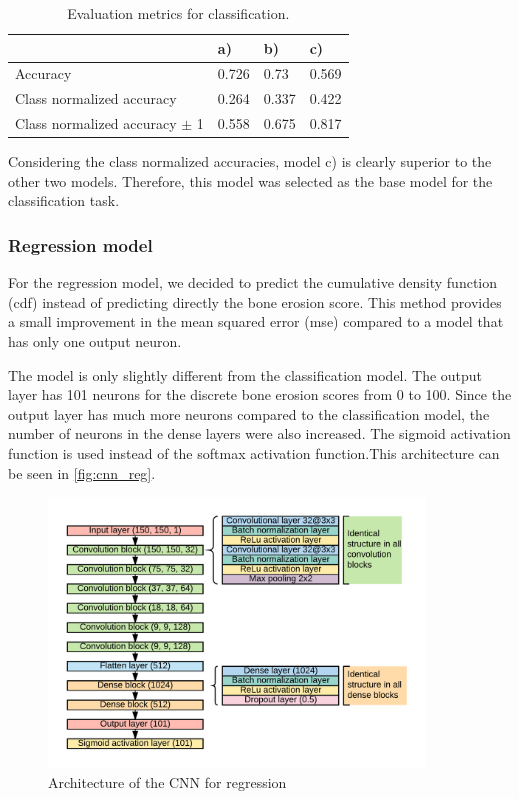 \documentclass[12pt]{article}
\begin{document}
\begin{table}[ht]
\centering
\caption{Evaluation metrics for classification.}
\label{tab:metrics_cla}
\begin{tabular}{@{}llll@{}}
\toprule
                                & a)    & b)    & c)    \\ \midrule
Accuracy                        & 0.726 & 0.73 & 0.569 \\
Class normalized accuracy       & 0.264 & 0.337 & 0.422 \\
Class normalized accuracy $\pm$ 1 & 0.558 & 0.675 & 0.817 \\ \bottomrule
\end{tabular}
\end{table}

Considering the class normalized accuracies, model c) is clearly superior to the other two models. Therefore, this model was selected as the base model for the classification task.

\subsubsection{Regression model}
\label{subsubsec:reg}


For the regression model, we decided to predict the cumulative density function (cdf) instead of predicting directly the bone erosion score. This method provides a small improvement in the mean squared error (mse) compared to a model that has only one output neuron.

The model is only slightly different from the classification model. The output layer has 101 neurons for the discrete bone erosion scores from 0 to 100. Since the output layer has much more neurons compared to the classification model, the number of neurons in the dense layers were also increased. The sigmoid activation function is used instead of the softmax activation function.This architecture can be seen in \autoref{fig:cnn_reg}.

\begin{figure}[ht]
\includegraphics[width=10cm]{cnn_regression}	
\caption{Architecture of the CNN for regression}
\label{fig:cnn_reg}
\end{figure}
\end{document}
